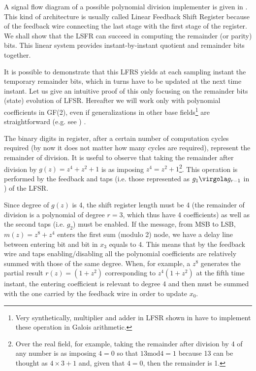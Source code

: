 A signal flow diagram of a possible polynomial division implementer is given in . This kind of architecture is usually called Linear Feedback Shift Register because of the feedback wire connecting the last stage with the first stage of the register. We shall show that the LSFR can succeed in computing the remainder (or parity) bits. This linear system provides instant-by-instant quotient and remainder bits together.

It is possible to demonstrate that this LFRS yields at each sampling instant the temporary remainder bits, which in turns have to be updated at the next time instant. Let us give an intuitive proof of this only focusing on the remainder bits (state) evolution of LFSR. Hereafter we will work only with polynomial coefficients in GF(2), even if generalizations in other base fields\footnote{Very synthetically, multiplier and adder in LFSR shown in  have to implement these operation in Galois arithmetic.} are straightforward (e.g. see \cite{b:mcwilliams, b:wicker, b:moon, b:ProakisDG}) .

The binary digits in register, after a certain number of computation cycles required (by now it does not matter how many cycles are required), represent the remainder of division. It is useful to observe that taking the remainder after division by \(g(z)=z^4+z^2+1\) is as imposing \(z^4=z^2+1\)\footnote{Over the real field, for example, taking the remainder after division by 4 of any number is as imposing \(4=0\) so that \(13 \textrm{mod} 4 = 1\) because 13 can be thought as \(4\times3+1\) and, given that \(4=0\), then the remainder is 1.}.
This operation is performed by the feedback and taps (i.e. those represented as \(g_1\virgola g_{r-1}\) in ) of the LFSR.

Since degree of \(g(z)\) is 4, the shift register length must be 4 (the remainder of division is a polynomial of degree \(r=3\), which thus have 4 coefficients) as well as the second taps (i.e. \(g_2\)) must be enabled. If the message, from MSB to LSB, \(m(z)=z^8+z^4\) enters the first sum (modulo 2) node, we have a delay line between entering bit and bit in \(x_3\) equals to 4. This means that by the feedback wire and taps enabling/disabling all the polynomial coefficients are relatively summed with those of the same degree. When, for example, a \(z^8\) generates the partial result \(r(z)=(1+z^2)\) corresponding to \(z^4(1+z^2)\) at the fifth time instant, the entering coefficient is relevant to degree 4 and then must be summed with the one carried by the feedback wire in order to update \(x_0\).


